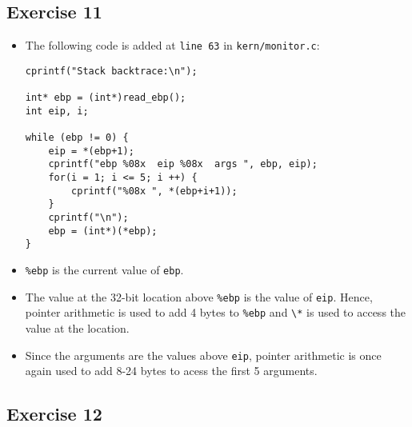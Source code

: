 \documentclass[]{article}
\begin{document}
\subsection{Exercise 11}

\begin{itemize}
\item
  The following code is added at \texttt{line 63} in
  \texttt{kern/monitor.c}:

\begin{verbatim}
cprintf("Stack backtrace:\n");

int* ebp = (int*)read_ebp();
int eip, i;

while (ebp != 0) {
    eip = *(ebp+1);
    cprintf("ebp %08x  eip %08x  args ", ebp, eip);
    for(i = 1; i <= 5; i ++) {
        cprintf("%08x ", *(ebp+i+1));
    }
    cprintf("\n");
    ebp = (int*)(*ebp);
}
\end{verbatim}
\item
  \texttt{\%ebp} is the current value of \texttt{ebp}.
\item
  The value at the 32-bit location above \texttt{\%ebp} is the value of
  \texttt{eip}. Hence, pointer arithmetic is used to add 4 bytes to
  \texttt{\%ebp} and \texttt{\textbackslash{}*} is used to access the
  value at the location.
\item
  Since the arguments are the values above \texttt{eip}, pointer
  arithmetic is once again used to add 8-24 bytes to acess the first 5
  arguments.
\end{itemize}

\subsection{Exercise 12}
\end{document}
